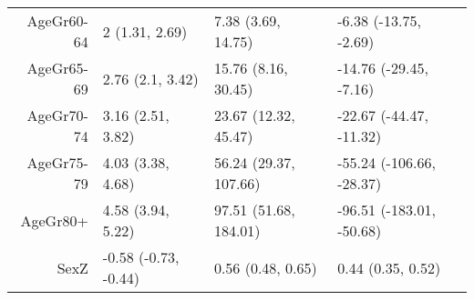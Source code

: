 \begin{table}[ht]
\begin{tabular}{rlll}
  AgeGr60-64 & 2 (1.31, 2.69) & 7.38 (3.69, 14.75) & -6.38 (-13.75, -2.69) \\ 
  AgeGr65-69 & 2.76 (2.1, 3.42) & 15.76 (8.16, 30.45) & -14.76 (-29.45, -7.16) \\ 
  AgeGr70-74 & 3.16 (2.51, 3.82) & 23.67 (12.32, 45.47) & -22.67 (-44.47, -11.32) \\ 
  AgeGr75-79 & 4.03 (3.38, 4.68) & 56.24 (29.37, 107.66) & -55.24 (-106.66, -28.37) \\ 
  AgeGr80+ & 4.58 (3.94, 5.22) & 97.51 (51.68, 184.01) & -96.51 (-183.01, -50.68) \\ 
  SexZ & -0.58 (-0.73, -0.44) & 0.56 (0.48, 0.65) & 0.44 (0.35, 0.52) \\ 
   \hline
\end{tabular}
\end{table}
